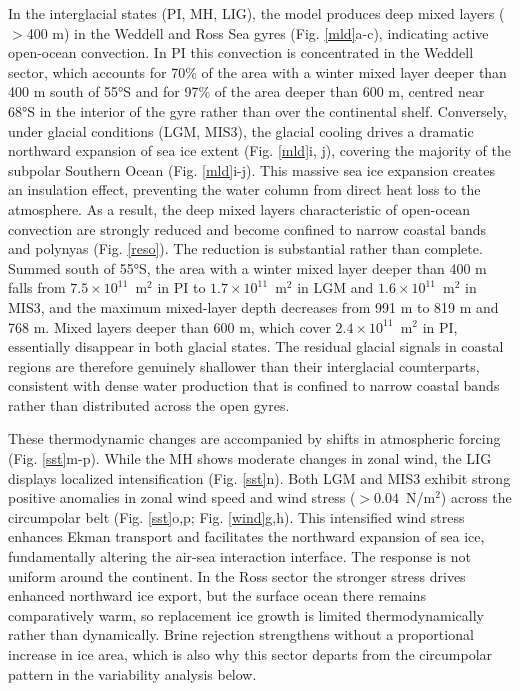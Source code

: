 \documentclass[pdflatex,sn-nature]{sn-jnl}
\begin{document}
In the interglacial states (PI, MH, LIG), the model produces deep mixed layers ($>$400 m) in the Weddell and Ross Sea gyres (Fig. \ref{mld}a-c), indicating active open-ocean convection. In PI this convection is concentrated in the Weddell sector, which accounts for 70\% of the area with a winter mixed layer deeper than 400 m south of 55°S and for 97\% of the area deeper than 600 m, centred near 68°S in the interior of the gyre rather than over the continental shelf. Conversely, under glacial conditions (LGM, MIS3), the glacial cooling drives a dramatic northward expansion of sea ice extent (Fig. \ref{mld}i, j), covering the majority of the subpolar Southern Ocean (Fig. \ref{mld}i-j). This massive sea ice expansion creates an insulation effect, preventing the water column from direct heat loss to the atmosphere. As a result, the deep mixed layers characteristic of open-ocean convection are strongly reduced and become confined to narrow coastal bands and polynyas (Fig. \ref{reso}). The reduction is substantial rather than complete. Summed south of 55°S, the area with a winter mixed layer deeper than 400 m falls from $7.5\times10^{11}$~m$^2$ in PI to $1.7\times10^{11}$~m$^2$ in LGM and $1.6\times10^{11}$~m$^2$ in MIS3, and the maximum mixed-layer depth decreases from 991 m to 819 m and 768 m. Mixed layers deeper than 600 m, which cover $2.4\times10^{11}$~m$^2$ in PI, essentially disappear in both glacial states. The residual glacial signals in coastal regions are therefore genuinely shallower than their interglacial counterparts, consistent with dense water production that is confined to narrow coastal bands rather than distributed across the open gyres. %


These thermodynamic changes are accompanied by shifts in atmospheric forcing (Fig. \ref{sst}m-p). While the MH shows moderate changes in zonal wind, the LIG displays localized intensification (Fig. \ref{sst}n). Both LGM and MIS3 exhibit strong positive anomalies in zonal wind speed and wind stress ($>0.04$~N/m$^2$) across the circumpolar belt (Fig. \ref{sst}o,p; Fig. \ref{wind}g,h). This intensified wind stress enhances Ekman transport and facilitates the northward expansion of sea ice, fundamentally altering the air-sea interaction interface. The response is not uniform around the continent. In the Ross sector the stronger stress drives enhanced northward ice export, but the surface ocean there remains comparatively warm, so replacement ice growth is limited thermodynamically rather than dynamically. Brine rejection strengthens without a proportional increase in ice area, which is also why this sector departs from the circumpolar pattern in the variability analysis below.
\end{document}
